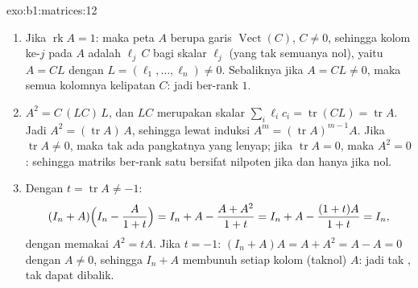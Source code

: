 \begin{solution}{exo:b1:matrices:12}
\begin{enumerate}
  \item Jika $\operatorname{rk} A = 1$: maka peta $A$ berupa garis
        $\operatorname{Vect}(C)$, $C \neq 0$, sehingga kolom ke-$j$
        pada $A$ adalah $\ell_j\,C$ bagi skalar $\ell_j$ (yang tak
        semuanya nol), yaitu $A = C L$ dengan $L = (\ell_1, \dots,
        \ell_n) \neq 0$. Sebaliknya jika $A = CL \neq 0$, maka semua
        kolomnya kelipatan $C$: jadi ber-rank $1$.
  \item $A^2 = C\,(L C)\,L$, dan $LC$ merupakan skalar $\sum_i
        \ell_i c_i = \operatorname{tr}(CL) = \operatorname{tr}
        A$. Jadi $A^2 = (\operatorname{tr} A)\,A$, sehingga lewat
        induksi $A^m = (\operatorname{tr} A)^{m-1} A$. Jika
        $\operatorname{tr} A \neq 0$, maka tak ada pangkatnya yang lenyap; jika
        $\operatorname{tr} A = 0$, maka $A^2 = 0$: sehingga matriks
        ber-rank satu bersifat nilpoten jika dan hanya jika  nol.
  \item Dengan $t = \operatorname{tr} A \neq -1$:
        \[
        (I_n + A)\Bigl(I_n - \frac{A}{1 + t}\Bigr)
        = I_n + A - \frac{A + A^2}{1 + t}
        = I_n + A - \frac{(1 + t)A}{1 + t} = I_n ,
        \]
        dengan memakai $A^2 = tA$. Jika $t = -1$: $(I_n + A)A = A + A^2 = A
        - A = 0$ dengan $A \neq 0$, sehingga $I_n + A$ membunuh setiap
        kolom (taknol) $A$: jadi tak , tak dapat dibalik.
\end{enumerate}
\end{solution}

